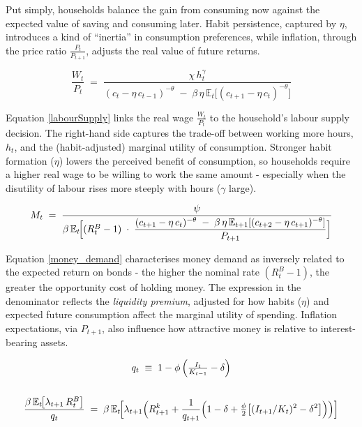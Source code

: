 \documentclass[11pt,preprint]{elsarticle}
\numberwithin{equation}{section}
\numberwithin{figure}{section}
\numberwithin{table}{section}
\begin{document}
Put simply, households balance the gain from consuming now against the
expected value of saving and consuming later. Habit persistence,
captured by \(\eta\), introduces a kind of ``inertia'' in consumption
preferences, while inflation, through the price ratio
\(\frac{P_t}{P_{t+1}}\), adjusts the real value of future returns.

\begin{equation}\label{labourSupply}
  \frac{W_t}{P_t}
  \;=\;
  \frac{\chi\,h_t^{\gamma}}
       {(c_t - \eta\,c_{t-1})^{-\theta}
        \;-\;
        \beta\,\eta\,\mathbb{E}_t\!\bigl[(c_{t+1} - \eta\,c_t)^{-\theta}\bigr]}
\end{equation}

Equation \ref{labourSupply} links the real wage \(\frac{W_t}{P_t}\) to
the household's labour supply decision. The right-hand side captures the
trade-off between working more hours, \(h_t\), and the (habit-adjusted)
marginal utility of consumption. Stronger habit formation (\(\eta\))
lowers the perceived benefit of consumption, so households require a
higher real wage to be willing to work the same amount - especially when
the disutility of labour rises more steeply with hours (\(\gamma\)
large).

\begin{equation}\label{money_demand}
  M_t
  \;=\;
  \frac{\psi}
       {\beta\,\mathbb{E}_t\!\Bigl[
         (R_t^B - 1)
         \;\cdot\;
         \dfrac{(c_{t+1} - \eta\,c_t)^{-\theta}
               \;-\;
               \beta\,\eta\,\mathbb{E}_{t+1}[(c_{t+2} - \eta\,c_{t+1})^{-\theta}]}
              {P_{t+1}}
       \Bigr]}
\end{equation}

Equation \ref{money_demand} characterises money demand as inversely
related to the expected return on bonds - the higher the nominal rate
\((R_t^B - 1)\), the greater the opportunity cost of holding money. The
expression in the denominator reflects the \emph{liquidity premium},
adjusted for how habits (\(\eta\)) and expected future consumption
affect the marginal utility of spending. Inflation expectations, via
\(P_{t+1}\), also influence how attractive money is relative to
interest-bearing assets.

\begin{equation}\label{capital_euler}
  \begin{gathered}
  q_t \;\equiv\; 1 - \phi\,\Bigl(\tfrac{I_t}{K_{t-1}} - \delta\Bigr) \\
  \\
  \frac{\beta\,\mathbb{E}_t\!\bigl[\lambda_{t+1}\,R_t^B\bigr]}{q_t}
  \;=\;
  \beta\,\mathbb{E}_t\!\Bigl[
    \lambda_{t+1}\Bigl(
      R_{t+1}^k
      + \frac{1}{q_{t+1}}
        \Bigl(
          1 - \delta
          + \tfrac{\phi}{2}\bigl[(I_{t+1}/K_t)^2 - \delta^2\bigr]
        \Bigr)
    \Bigr)
  \Bigr]
  \end{gathered}
\end{equation}
\end{document}
